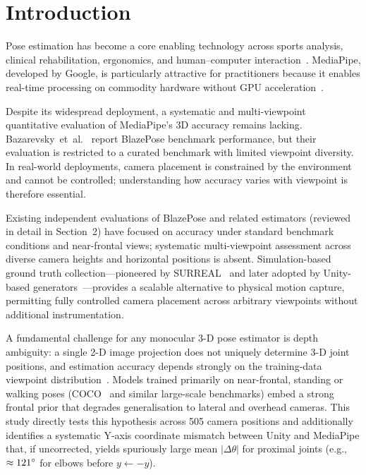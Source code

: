 \documentclass[twocolumn]{article}
\begin{document}
\section{Introduction}

Pose estimation has become a core enabling technology across sports
analysis, clinical rehabilitation, ergonomics, and human--computer
interaction~\cite{mediapipe,blazepose}. MediaPipe, developed by Google, is
particularly attractive for practitioners because it enables real-time
processing on commodity hardware without GPU acceleration~\cite{mediapipe}.

Despite its widespread deployment, a systematic and multi-viewpoint
quantitative evaluation of MediaPipe's 3D accuracy remains lacking.
Bazarevsky~et~al.~\cite{blazepose} report BlazePose benchmark performance,
but their evaluation is restricted to a curated benchmark with limited
viewpoint diversity. In real-world deployments, camera placement is
constrained by the environment and cannot be controlled; understanding how
accuracy varies with viewpoint is therefore essential.

Existing independent evaluations of BlazePose and related estimators
(reviewed in detail in Section~2) have focused on accuracy under standard
benchmark conditions and near-frontal views; systematic multi-viewpoint
assessment across diverse camera heights and horizontal positions is
absent. Simulation-based ground truth collection---pioneered
by SURREAL~\cite{surreal} and later adopted by Unity-based
generators~\cite{peoplesanspeople}---provides a scalable alternative to
physical motion capture, permitting fully controlled camera placement across
arbitrary viewpoints without additional instrumentation.

A fundamental challenge for any monocular 3-D pose estimator is depth
ambiguity: a single 2-D image projection does not uniquely determine 3-D
joint positions, and estimation accuracy depends strongly on the training-data
viewpoint distribution~\cite{mehta2017}. Models trained primarily on
near-frontal, standing or walking poses (COCO~\cite{coco} and similar
large-scale benchmarks) embed a strong frontal prior that degrades generalisation
to lateral and overhead cameras. This study directly tests this hypothesis
across 505 camera positions and additionally identifies a systematic
Y-axis coordinate mismatch between Unity and MediaPipe that, if uncorrected,
yields spuriously large mean $|\Delta\theta|$ for proximal joints (e.g.,
$\approx121\degree{}$ for elbows before $y \leftarrow -y$).
\end{document}
